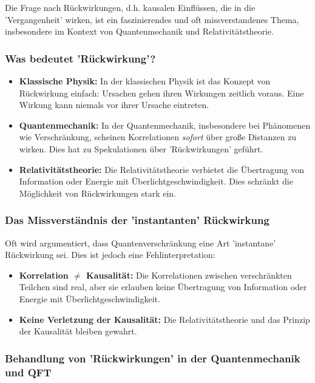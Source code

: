 \documentclass{article}
\begin{document}
	Die Frage nach Rückwirkungen, d.h. kausalen Einflüssen, die in die 'Vergangenheit' wirken, ist ein faszinierendes und oft missverstandenes Thema, insbesondere im Kontext von Quantenmechanik und Relativitätstheorie.
	
	\subsubsection{Was bedeutet 'Rückwirkung'?}
	
	\begin{itemize}
		\item \textbf{Klassische Physik:} In der klassischen Physik ist das Konzept von Rückwirkung einfach: Ursachen gehen ihren Wirkungen zeitlich voraus. Eine Wirkung kann niemals vor ihrer Ursache eintreten.
		\item \textbf{Quantenmechanik:} In der Quantenmechanik, insbesondere bei Phänomenen wie Verschränkung, scheinen Korrelationen \textit{sofort} über große Distanzen zu wirken. Dies hat zu Spekulationen über 'Rückwirkungen' geführt.
		\item \textbf{Relativitätstheorie:} Die Relativitätstheorie verbietet die Übertragung von Information oder Energie mit Überlichtgeschwindigkeit. Dies schränkt die Möglichkeit von Rückwirkungen stark ein.
	\end{itemize}
	
	\subsubsection{Das Missverständnis der 'instantanten' Rückwirkung}
	
	Oft wird argumentiert, dass Quantenverschränkung eine Art 'instantane' Rückwirkung sei. Dies ist jedoch eine Fehlinterpretation:
	
	\begin{itemize}
		\item \textbf{Korrelation $\neq$ Kausalität:} Die Korrelationen zwischen verschränkten Teilchen sind real, aber sie erlauben keine Übertragung von Information oder Energie mit Überlichtgeschwindigkeit.
		\item \textbf{Keine Verletzung der Kausalität:} Die Relativitätstheorie und das Prinzip der Kausalität bleiben gewahrt.
	\end{itemize}
	
	\subsubsection{Behandlung von 'Rückwirkungen' in der Quantenmechanik und QFT}
	
\end{document}
